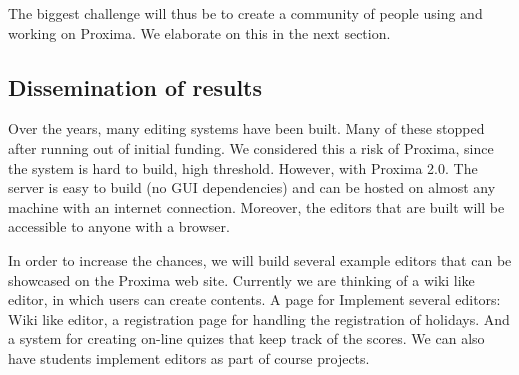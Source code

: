 \documentclass[10pt]{article}
\begin{document}
The biggest challenge will thus be to create a community of people using and working on Proxima. We elaborate on this in the next section.

\subsection{Dissemination of results}

Over the years, many editing systems have been built. Many of these stopped after running out of initial funding. We considered this a risk of Proxima, since the system is hard to build, high threshold. However, with Proxima 2.0. The server is easy to build (no GUI dependencies) and can be hosted on almost any machine with an internet connection. Moreover, the editors that are built will be accessible to anyone with a browser.

In order to increase the chances, we will build several example editors that can be showcased on the Proxima web site. Currently we are thinking of a wiki like editor, in which users can create contents. A page for
Implement several editors: Wiki like editor, a registration page for handling the registration of holidays. And a system for creating on-line quizes that keep track of the scores. We can also have students implement editors as part of course projects.


%
% 
\end{document}
